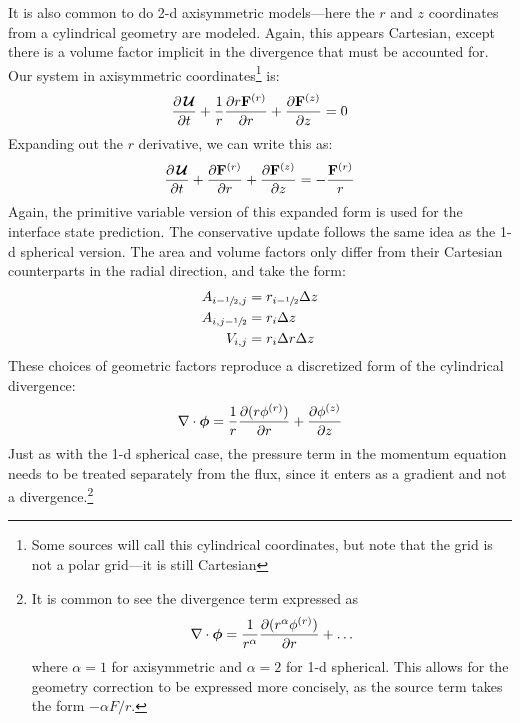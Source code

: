 It is also common to do 2-d axisymmetric models---here the $r$ and $z$
coordinates from a cylindrical geometry are modeled.  Again, this
appears Cartesian, except there is a volume factor implicit in the
divergence that must be accounted for.  Our system in axisymmetric
coordinates\footnote{Some sources will call this cylindrical
  coordinates, but note that the grid is not a polar grid---it is
  still Cartesian} is:
\begin{equation}
\frac{\partial {\,\boldsymbol{\mathcal{U}}}}{\partial t}
  + \frac{1}{r}\frac{\partial r {\bf F}^{(r)}}{\partial r}
  + \frac{\partial {\bf F}^{(z)}}{\partial z} = 0
\end{equation}
Expanding out the $r$ derivative, we can write this as:
\begin{equation}
\frac{\partial {\,\boldsymbol{\mathcal{U}}}}{\partial t}
  + \frac{\partial {\bf F}^{(r)}}{\partial r}
  + \frac{\partial {\bf F}^{(z)}}{\partial z} = -\frac{{\bf F}^{(r)}}{r}
\end{equation}
Again, the primitive variable version of this expanded form is used
for the interface state prediction.  The conservative update
follows the same idea as the 1-d spherical version.  The area
and volume factors only differ from their Cartesian counterparts
in the radial direction, and take the form:
\begin{align}
A_{i-{\sfrac{1}{2}},j} &= r_{i-{\sfrac{1}{2}}} \Delta z \\
A_{i,j-{\sfrac{1}{2}}} &= r_i \Delta z\\
V_{i,j} &= r_i \Delta r \Delta z
\end{align}
These choices of geometric factors reproduce a discretized
form of the cylindrical divergence:
\begin{equation}
\nabla \cdot {\boldsymbol{\phi}} = \frac{1}{r} {\frac{{\partial(r\phi^{(r)})}}{\partial r}} + {\frac{{\partial\phi^{(z)}}}{\partial z}}
\end{equation}
Just as with the 1-d spherical case, the pressure term in the momentum
equation needs to be treated separately from the flux, since it enters
as a gradient and not a divergence.\footnote{It is common to see the divergence
term expressed as 
\begin{equation}
\nabla \cdot {\boldsymbol{\phi}} = \frac{1}{r^\alpha} {\frac{{\partial(r^\alpha \phi^{(r)})}}{\partial r}} + \ldots
\end{equation}
where $\alpha = 1$ for axisymmetric and $\alpha = 2$ for 1-d
spherical.  This allows for the geometry correction to be expressed
more concisely, as the source term takes the form $-\alpha F/r$.  }


